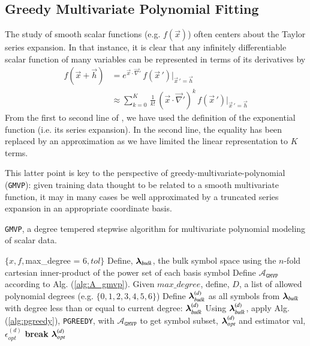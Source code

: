 \documentclass[twocolumn,aps,prd,floatfix,preprintnumbers,a4paper,nofootinbib,
superscriptaddress,10pt]{revtex4-1}
\def\gmvp#1{greedy-multivariate-polynomial#1
  (\texttt{GMVP}#1)\gdef\gmvp{\texttt{GMVP}}}
\def\pgreedy{\texttt{PGREEDY}}
\begin{document}
\subsection{Greedy Multivariate Polynomial Fitting}
%
The study of smooth scalar functions (e.g. $f(\vec{x})$) often centers about the Taylor series expansion.
%
In that instance, it is clear that any infinitely differentiable scalar function of many variables can be represented in terms of its derivatives by
%
\begin{align}
  \label{eq:mvt}
  f( \vec{x} + \vec{h} ) &= e^{ \vec{x} \cdot \vec{\nabla}' } \, f(\vec{x}\,') |_{\vec{x}\,'=\vec{h}}
  \\ \nonumber
  &\approx \sum_{k=0}^{K} \, \frac{1}{k!} \, (\vec{x} \cdot \vec{\nabla}')^{k} \, f(\vec{x}\,') |_{\vec{x}\,'=\vec{h}}
\end{align}
%
From the first to second line of , we have used the definition of the exponential function (i.e. its series expansion).
%
In the second line, the equality has been replaced by an approximation as we have limited the linear representation to $K$ terms.
%
\par This latter point is key to the perspective of \gmvp{}:
%
given training data thought to be related to a smooth multivariate function, it may in many cases be well approximated by a truncated series expansion in an appropriate coordinate basis.
%
\hspace{1cm}
{\scriptsize
\begin{algorithm}[H]
  \caption{\gmvp{}, a degree tempered stepwise algorithm for multivariate polynomial modeling of scalar data.}
  \label{alg:gmvp}
  \begin{algorithmic}[1]
     $ \{ x, f, $max\_degree = 6$, tol \}$
    \vskip 10pt
    \State Define, ${\bm{\lambda}}_{bulk}$, the bulk symbol space using the $n$-fold cartesian inner-product of the power set of each basis symbol
    \State Define $\mathcal{A}_{\gmvp{}}$ according to Alg. (\ref{alg:A_gmvp}).
    \State Given $max\_degree$, define, ${ D}$, a list of allowed polynomial degrees (e.g. $\{0,1,2,3,4,5,6\}$)
      \State Define ${\bm{\lambda}}_{bulk}^{(d)}$ as all symbols from ${\bm{\lambda}}_{bulk}$ with degree less than or equal to current degree: ${\bm{\lambda}}^{(d)}_{bulk}$
      \State Using ${\bm{\lambda}}_{bulk}^{(d)}$, apply Alg. (\ref{alg:pgreedy}), \pgreedy{}, with $\mathcal{A}_{\gmvp{}}$ to get symbol subset, ${\bm{\lambda}}^{(d)}_{opt}$ and estimator val, $\epsilon^{(d)}_{opt}$
        \State \textbf{break}
      \EndIf
    \EndFor
    \vskip 10pt
     ${\bm{\lambda}}^{(d)}_{opt}$
  \end{algorithmic}
\end{algorithm}
}
\end{document}
